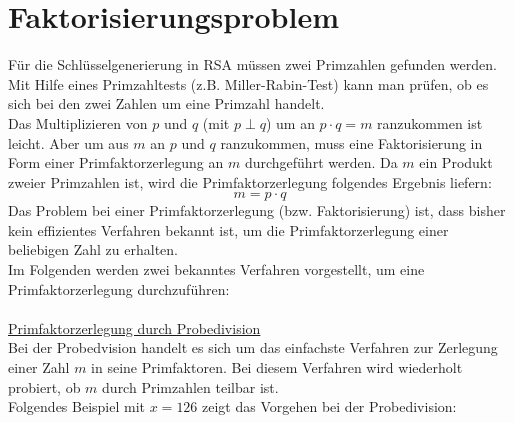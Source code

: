 \section{Faktorisierungsproblem}
\label{sec:Faktorisierungsproblem}
Für die Schlüsselgenerierung in RSA müssen zwei Primzahlen gefunden werden. Mit Hilfe eines Primzahltests (z.B. Miller-Rabin-Test) kann man prüfen, ob es sich bei den zwei Zahlen um eine Primzahl handelt.\\
Das Multiplizieren von $p$ und $q$ (mit $p\perp q$) um an $p\cdot q=m$ ranzukommen ist leicht. Aber um aus $m$ an $p$ und $q$ ranzukommen, muss eine Faktorisierung in Form einer Primfaktorzerlegung an $m$ durchgeführt werden. Da $m$ ein Produkt zweier Primzahlen ist, wird die Primfaktorzerlegung folgendes Ergebnis liefern:
\begin{equation*}
\label{formel:m_aus_Primzahlen}
m=p\cdot q
\end{equation*}
Das Problem bei einer Primfaktorzerlegung (bzw. Faktorisierung) ist, dass bisher kein effizientes Verfahren bekannt ist, um die Primfaktorzerlegung einer beliebigen Zahl zu erhalten.\\
Im Folgenden werden zwei bekanntes Verfahren vorgestellt, um eine Primfaktorzerlegung durchzuführen:
\\
\\
\underline{Primfaktorzerlegung durch Probedivision}\\
Bei der Probedvision handelt es sich um das einfachste Verfahren zur Zerlegung einer Zahl $m$ in seine Primfaktoren. Bei diesem Verfahren wird wiederholt \glqq probiert\grqq, ob $m$ durch Primzahlen teilbar ist.\\
Folgendes Beispiel mit $x=126$ zeigt das Vorgehen bei der Probedivision:
\\
\\
